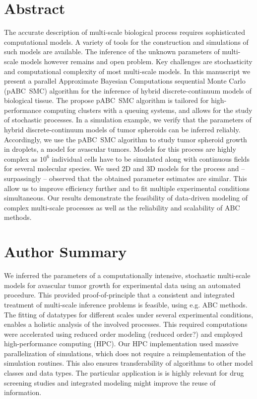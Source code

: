 \documentclass[10pt,letterpaper]{article}
\newcommand{\nj}[1]{{\color{blue}#1}}
\begin{document}
\tableofcontents

\section*{Abstract}
The accurate description of multi-scale biological process requires sophisticated computational models. A variety of tools for the construction and simulations of such models are available. The inference of the unknown parameters of multi-scale models however remains and open problem. Key challenges are stochasticity and computational complexity of most multi-scale models. In this manuscript we present a parallel Approximate Bayesian Computations sequential Monte Carlo (pABC~SMC) algorithm for the inference of hybrid discrete-continuum models of biological tissue. The propose pABC~SMC algorithm is tailored for high-performance computing clusters with a queuing systems, and allows for the study of stochastic processes. In a simulation example, we verify that the parameters of hybrid discrete-continuum models of tumor spheroids can be inferred reliably. Accordingly, we use the pABC~SMC algorithm to study tumor spheroid growth in droplets, a model for avascular tumors. Models for this process are highly complex as $10^6$ individual cells have to be simulated along with continuous fields for several molecular species. We used 2D and 3D models for the process and -- surpassingly -- observed that the obtained parameter estimates are similar. This allow us to improve efficiency further and to fit multiple experimental conditions simultaneous. Our results demonstrate the feasibility of data-driven modeling of complex multi-scale processes as well as the reliability and scalability of ABC methods.

\section*{Author Summary}
We inferred the parameters of a computationally intensive, stochastic multi-scale models for avascular tumor growth for experimental data using an automated procedure. This provided proof-of-principle that a consistent and integrated treatment of multi-scale inference problems is feasible, using e.g. ABC methods. The fitting of datatypes for different scales under several experimental conditions, enables a holistic analysis of the involved processes. This required computations were accelerated using reduced order modeling \nj{(reduced order?)} and employed high-performance computing (HPC). Our HPC implementation used massive parallelization of simulations, which does not require a reimplementation of the simulation routines. This also ensures transferability of algorithms to other model classes and data types. The particular application is is highly relevant for drug screening studies and integrated modeling might improve the reuse of information.
\end{document}
